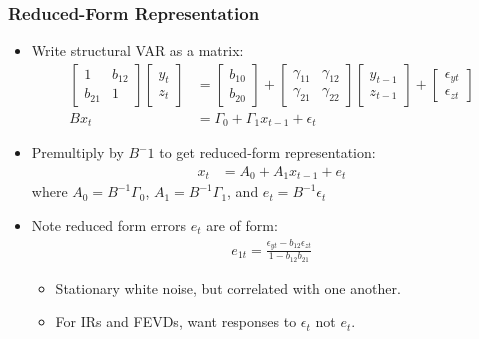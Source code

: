 \documentclass[english,xcolor=svgnames]{beamer}
\begin{document}
\begin{frame}
\frametitle{Reduced-Form Representation
}
\begin{itemize}
	\item Write structural VAR as a matrix:
	\begin{align*}
	\begin{bmatrix} 
	1 & b_{12} \\ b_{21} & 1
	\end{bmatrix}
	\begin{bmatrix} 
	y_t \\ z_t
	\end{bmatrix} &=
	\begin{bmatrix} 
	b_{10} \\ b_{20}
	\end{bmatrix} + 
	\begin{bmatrix} 
	\gamma_{11} & \gamma_{12} \\ \gamma_{21} & \gamma_{22}
	\end{bmatrix}
	\begin{bmatrix} 
	y_{t-1} \\ z_{t-1}
	\end{bmatrix}+
	\begin{bmatrix} 
	\epsilon_{yt} \\ \epsilon_{zt}
	\end{bmatrix} \\
		Bx_t &= \Gamma_0 + \Gamma_1 x_{t-1}+\epsilon_{t}
	\end{align*}
	\item Premultiply by $B^-1$ to get reduced-form representation:
	\begin{align*} 
		x_t &= A_0 + A_1 x_{t-1}+e_{t}
	\end{align*}
	where $A_0=B^{-1}\Gamma_0$, $A_1=B^{-1}\Gamma_1$, and $e_{t}=B^{-1}\epsilon_{t}$
	\item Note reduced form errors $e_t$ are of form:
	\begin{align*}
		e_{1t}=\frac{\epsilon_{yt}-b_{12}\epsilon_{zt}}{1-b_{12}b_{21}}
	\end{align*}
	\begin{itemize}
		\item Stationary white noise, but correlated with one another.
		\item For IRs and FEVDs, want responses to $\epsilon_t$ not $e_t$.
	\end{itemize}
\end{itemize}
\end{frame}
\end{document}
